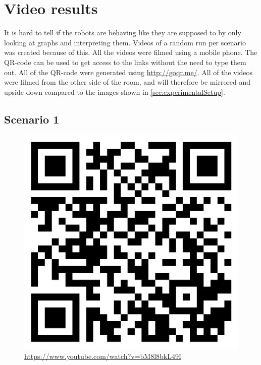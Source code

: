\chapter{Video results}
It is hard to tell if the robots are behaving like they are supposed to by only looking at graphs and interpreting them.
Videos of a random run per scenario was created because of this.
All the videos were filmed using a mobile phone. The QR-code can be used to get access to the links without the need to type them out. All of the QR-code were generated using \href{http://goqr.me/}{http://goqr.me/}.
All of the videos were filmed from the other side of the room, and will therefore be mirrored and upside down compared to the images shown in \ref{sec:experimentalSetup}.
\clearpage
\section{Scenario 1}
\begin{figure}[h]
\begin{center}
\includegraphics[width=0.8\linewidth]{figs/qr/qrcode1}
\caption*{\href{https://www.youtube.com/watch?v=bM8l8bkL49I}{https://www.youtube.com/watch?v=bM8l8bkL49I}}
\end{center}
\end{figure}
\clearpage
